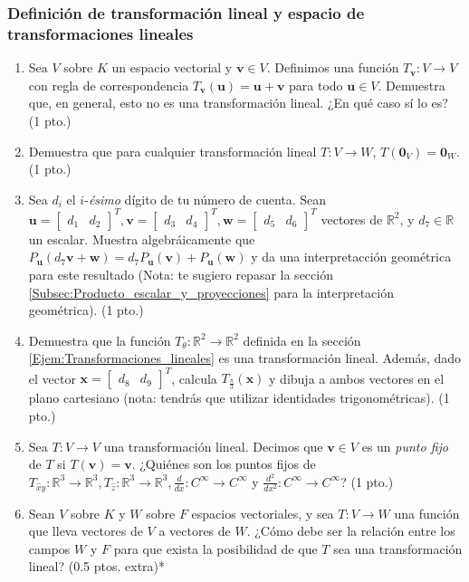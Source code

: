 \documentclass[12pt]{article}
\begin{document}
\subsubsection{Definición de transformación lineal y espacio de transformaciones lineales}
\begin{enumerate}
    \item Sea $V$ sobre $K$ un espacio vectorial y $\mathbf{v}\in V$. Definimos una función $T_{\mathbf{v}}:V\to V$ con regla de correspondencia $T_{\mathbf{v}}(\mathbf{u}) = \mathbf{u}+\mathbf{v}$ para todo $\mathbf{u}\in V$. Demuestra que, en general, esto no es una transformación lineal. ¿En qué caso sí lo es? (1 pto.)
    \item Demuestra que para cualquier transformación lineal $T:V\to W$, $T(\mathbf{0}_V)=\mathbf{0}_W.$ (1 pto.)
    \item Sea $d_i$ el $i$-\emph{ésimo} dígito de tu número de cuenta. Sean $\mathbf{u}=\begin{bmatrix} d_1&d_2 \end{bmatrix}^T, \mathbf{v}=\begin{bmatrix} d_3&d_4 \end{bmatrix}^T, \mathbf{w}=\begin{bmatrix} d_5&d_6 \end{bmatrix}^T$ vectores de $\mathbb{R}^2$, y $d_7\in \mathbb{R}$ un escalar. Muestra algebráicamente que $P_{\mathbf{u}}(d_7\mathbf{v}+\mathbf{w})=d_7 P_{\mathbf{u}}(\mathbf{v})+P_{\mathbf{u}}(\mathbf{w})$ y da una interpretacción geométrica para este resultado (Nota: te sugiero repasar la sección \ref{Subsec:Producto_escalar_y_proyecciones} para la interpretación geométrica). (1 pto.)
    \item Demuestra que la función $T_{\theta}:\mathbb{R}^2\to\mathbb{R}^2$ definida en la sección \ref{Ejem:Transformaciones_lineales} es una transformación lineal. Además, dado el vector $\mathbf{x}=\begin{bmatrix} d_8 & d_9 \end{bmatrix}^T$, calcula $T_{\frac{\pi}{3}}(\mathbf{x})$ y dibuja a ambos vectores en el plano cartesiano (nota: tendrás que utilizar identidades trigonométricas). (1 pto.)
    \item Sea $T:V\to V$ una transformación lineal. Decimos que $\mathbf{v}\in V$ es un \emph{punto fijo} de $T$ si $T(\mathbf{v})=\mathbf{v}$. ¿Quiénes son los puntos fijos de $T_{\hat{x}\hat{{y}}}:\mathbb{R}^3\to\mathbb{R}^3, T_{\hat{z}}:\mathbb{R}^3\to\mathbb{R}^3, \frac{d}{dx}:C^\infty\to C^\infty$ y $\frac{d^2}{dx^2}:C^\infty\to C^\infty$? (1 pto.)
    \item Sean $V$ sobre $K$ y $W$ sobre $F$ espacios vectoriales, y sea $T:V\to W$ una función que lleva vectores de $V$ a vectores de $W$. ¿Cómo debe ser la relación entre los campos $W$ y $F$ para que exista la posibilidad de que $T$ sea una transformación lineal? (0.5 ptos. extra)*
\end{enumerate}
\end{document}

